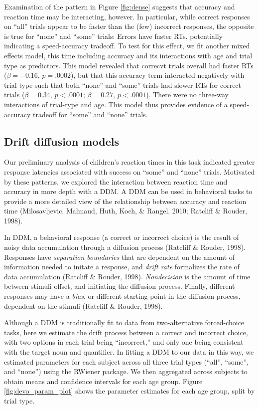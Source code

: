\documentclass[10pt, letterpaper]{article}
\begin{document}
Examination of the pattern in Figure \ref{fig:dense} suggests that
accuracy and reaction time may be interacting, however. In particular,
while correct responses on ``all'' trials appear to be faster than the
(few) incorrect responses, the opposite is true for ``none'' and
``some'' trials: Errors have faster RTs, potentially indicating a
speed-accuracy tradeoff. To test for this effect, we fit another mixed
effects model, this time including accuracy and its interactions with
age and trial type as predictors. This model revealed that correcvt
trials overall had faster RTs (\(\beta = -0.16\), \(p = .0002\)), but
that this accuracy term interacted negatively with trial type such that
both ``none'' and ``some'' trials had slower RTs for correct trials
(\(\beta = 0.34\), \(p < .0001\); \(\beta = 0.27\), \(p < .0001\)).
There were no three-way interactions of trial-type and age. This model
thus provides evidence of a speed-accuracy tradeoff for ``some'' and
``none'' trials.

\subsection{Drift diffusion models}\label{drift-diffusion-models}

Our preliminary analysis of children's reaction times in this task
indicated greater response latencies associated with success on ``some''
and ``none'' trials. Motivated by these patterns, we explored the
interaction between reaction time and accuracy in more depth with a DDM.
A DDM can be used in behavioral tasks to provide a more detailed view of
the relationship between accuracy and reaction time (Milosavljevic,
Malmaud, Huth, Koch, \& Rangel, 2010; Ratcliff \& Rouder, 1998).

In DDM, a behavioral response (a correct or incorrect choice) is the
result of noisy data accumulation through a diffusion process (Ratcliff
\& Rouder, 1998). Responses have \emph{separation boundaries} that are
dependent on the amount of information needed to initate a response, and
\emph{drift rate} formalizes the rate of data accumulation (Ratcliff \&
Rouder, 1998). \emph{Nondecision} is the amount of time between stimuli
offset, and initiating the diffusion process. Finally, different
responses may have a \emph{bias}, or different starting point in the
diffusion process, dependent on the stimuli (Ratcliff \& Rouder, 1998).

Although a DDM is traditionally fit to data from two-alternative
forced-choice tasks, here we estimate the drift process between a
correct and incorrect choice, with two options in each trial being
``incorrect,'' and only one being consistent with the target noun and
quantifier. In fitting a DDM to our data in this way, we estimated
parameters for each subject across all three trial types (``all'',
``some'', and ``none'') using the RWiener package. We then aggregated
across subjects to obtain means and confidence intervals for each age
group. Figure \ref{fig:devo_param_plot} shows the parameter estimates
for each age group, split by trial type.
\end{document}
